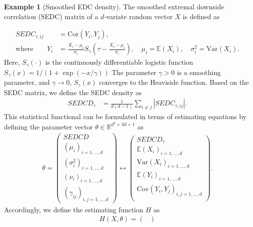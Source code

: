 \documentclass[12pt,a4paper]{article}
\theoremstyle{definition}
\newtheorem{example}{Example}[section]
\theoremstyle{definition}
\theoremstyle{theorem}
\newcommand{\R}{\mathbb{R}}
\newcommand{\E}{\mathbb{E}}
\begin{document}
\begin{example}[Smoothed EDC density]
    The smoothed extremal downside correlation (SEDC) matrix of a $d$-variate random vector $X$ is defined as 
    
    \begin{align*}
        SEDC_{\tau,ij} &= \mathrm{Cor}(Y_i, Y_j), \\
        \text{where}\qquad Y_i &= \frac{X_i-\mu_i}{\sigma_i} S_\gamma\left(\tau- \tfrac{X_i-\mu_i}{\sigma_i} \right),\quad
        \mu_i=\E(X_i),\quad \sigma_i^2=\mathrm{Var}(X_i).
    \end{align*}
    Here, $S_\gamma(\cdot)$ is the continuously differentiable logistic function $S_\gamma(x) = 1/(1 + \exp(-x/\gamma))$
    The parameter $\gamma > 0$ is a smoothing parameter, and $\gamma \rightarrow 0$, $S_\gamma(x)$ converges to the Heaviside function.
    Based on the SEDC matrix, we define the SEDC density as
    \begin{align*}
        SEDCD_\tau &= \frac{1}{d(d-1)}\sum_{i \neq j }|SEDC_{\tau,ij}|.
    \end{align*}
    This statistical functional can be formulated in terms of estimating equations by defining the parameter vector $\theta\in \R^{d^2 + 3d +1}$ as
    \begin{align*}
        \theta = \begin{pmatrix}
            SEDCD\\
            (\mu_i)_{i=1,\ldots,d} \\
            (\sigma_i^2)_{i=1,\ldots, d} \\
            (\nu_i)_{i=1,\ldots,d}\\
            (\gamma_{ij})_{i,j=1,\ldots, d}             
        \end{pmatrix} \leftrightarrow 
        \begin{pmatrix}
            SEDCD_\tau\\
            \E(X_i)_{i=1,\ldots, d}\\
            \mathrm{Var}(X_i)_{i=1,\ldots,d}\\
            \E(Y_i)_{i=1,\ldots, d}\\
            \mathrm{Cov}(Y_i, Y_j)_{i,j=1,\ldots, d} \\
        \end{pmatrix}.
    \end{align*}
    Accordingly, we define the estimating function $H$ as
    \begin{align*}
        H(X,\theta)= \begin{pmatrix}

\end{pmatrix}
\end{align*}
\end{example}
\end{document}
